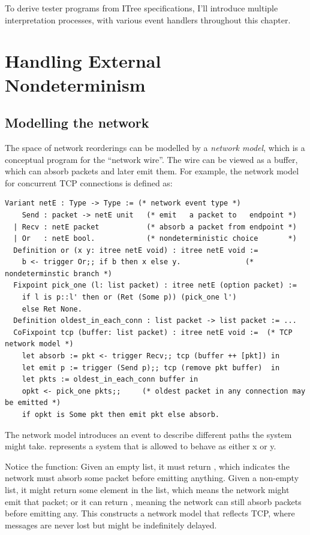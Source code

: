 To derive tester programs from ITree specifications, I'll introduce multiple
interpretation processes, with various event handlers throughout this chapter.

\section{Handling External Nondeterminism}
\label{sec:external-nondet}
\subsection{Modelling the network}
\label{sec:net-tcp}
The space of network reorderings can be modelled by a {\em network model}, which
is a conceptual program for the ``network wire''.  The wire can be viewed as a
buffer, which can absorb packets and later emit them.  For example, the network
model for concurrent TCP connections is defined as:
\begin{lstlisting}[style=customcoq]
  Variant netE : Type -> Type := (* network event type *)
    Send : packet -> netE unit   (* emit   a packet to   endpoint *)
  | Recv : netE packet           (* absorb a packet from endpoint *)
  | Or   : netE bool.            (* nondeterministic choice       *)
  Definition or (x y: itree netE void) : itree netE void :=
    b <- trigger Or;; if b then x else y.               (* nondeterminstic branch *)
  Fixpoint pick_one (l: list packet) : itree netE (option packet) :=
    if l is p::l' then or (Ret (Some p)) (pick_one l')
    else Ret None.
  Definition oldest_in_each_conn : list packet -> list packet := ...
  CoFixpoint tcp (buffer: list packet) : itree netE void :=  (* TCP network model *)
    let absorb := pkt <- trigger Recv;; tcp (buffer ++ [pkt]) in
    let emit p := trigger (Send p);; tcp (remove pkt buffer)  in
    let pkts := oldest_in_each_conn buffer in
    opkt <- pick_one pkts;;     (* oldest packet in any connection may be emitted *)
    if opkt is Some pkt then emit pkt else absorb.
\end{lstlisting}
The network model introduces an  event to describe different paths the
system might take.   represents a system that is allowed to behave
as either \ilc x or \ilc y.

Notice the  function: Given an empty list, it must return
, which indicates the network must absorb some packet before emitting
anything.  Given a non-empty list, it might return some element in the list,
which means the network might emit that packet; or it can return ,
meaning the network can still absorb packets before emitting any.  This
constructs a network model that reflects TCP, where messages are never lost but
might be indefinitely delayed.

